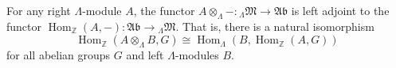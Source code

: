 For any right $\Lambda$-module $A$, the functor $A \otimes_\Lambda - : {}_\Lambda\mathfrak{M} \to \mathfrak{Ab}$ is left adjoint to the functor $\operatorname{Hom}_\mathbb{Z}(A, -) : \mathfrak{Ab} \to {}_\Lambda\mathfrak{M}$. That is, there is a natural isomorphism
$$
\operatorname{Hom}_\mathbb{Z}(A \otimes_\Lambda B, G) \cong \operatorname{Hom}_\Lambda(B, \operatorname{Hom}_\mathbb{Z}(A, G))
$$
for all abelian groups $G$ and left $\Lambda$-modules $B$.
